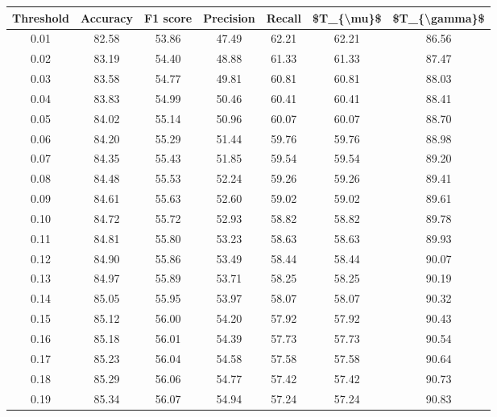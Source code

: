 \begin{tabular}{|c|c|c|c|c|c|c|}
\hline
 Threshold &  Accuracy &  F1 score &  Precision &  Recall &  \$T\_\{\textbackslash mu\}\$ &  \$T\_\{\textbackslash gamma\}\$ \\
\hline
      0.01 &     82.58 &     53.86 &      47.49 &   62.21 &      62.21 &         86.56 \\
      0.02 &     83.19 &     54.40 &      48.88 &   61.33 &      61.33 &         87.47 \\
      0.03 &     83.58 &     54.77 &      49.81 &   60.81 &      60.81 &         88.03 \\
      0.04 &     83.83 &     54.99 &      50.46 &   60.41 &      60.41 &         88.41 \\
      0.05 &     84.02 &     55.14 &      50.96 &   60.07 &      60.07 &         88.70 \\
      0.06 &     84.20 &     55.29 &      51.44 &   59.76 &      59.76 &         88.98 \\
      0.07 &     84.35 &     55.43 &      51.85 &   59.54 &      59.54 &         89.20 \\
      0.08 &     84.48 &     55.53 &      52.24 &   59.26 &      59.26 &         89.41 \\
      0.09 &     84.61 &     55.63 &      52.60 &   59.02 &      59.02 &         89.61 \\
      0.10 &     84.72 &     55.72 &      52.93 &   58.82 &      58.82 &         89.78 \\
      0.11 &     84.81 &     55.80 &      53.23 &   58.63 &      58.63 &         89.93 \\
      0.12 &     84.90 &     55.86 &      53.49 &   58.44 &      58.44 &         90.07 \\
      0.13 &     84.97 &     55.89 &      53.71 &   58.25 &      58.25 &         90.19 \\
      0.14 &     85.05 &     55.95 &      53.97 &   58.07 &      58.07 &         90.32 \\
      0.15 &     85.12 &     56.00 &      54.20 &   57.92 &      57.92 &         90.43 \\
      0.16 &     85.18 &     56.01 &      54.39 &   57.73 &      57.73 &         90.54 \\
      0.17 &     85.23 &     56.04 &      54.58 &   57.58 &      57.58 &         90.64 \\
      0.18 &     85.29 &     56.06 &      54.77 &   57.42 &      57.42 &         90.73 \\
      0.19 &     85.34 &     56.07 &      54.94 &   57.24 &      57.24 &         90.83 \\

\end{tabular}

